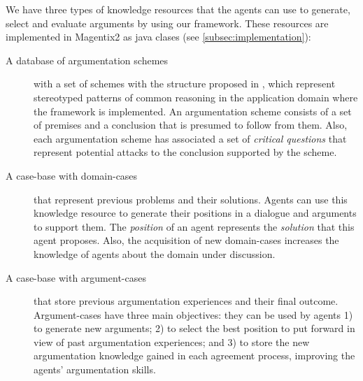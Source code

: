 %


We have three types of knowledge resources that the agents can use to generate, select and evaluate arguments by using our framework. These resources are implemented in Magentix2 as java clases (see \ref{subsec:implementation}):

\begin{description}
 \item[A database of argumentation schemes] with a set of schemes with the structure proposed in \cite{Walton08}, which represent stereotyped patterns of common reasoning in the application domain where the framework is implemented. An argumentation scheme consists of a set of premises and a conclusion that is presumed to follow from them. Also, each argumentation scheme has associated a set of \emph{critical questions} that represent potential attacks to the conclusion supported by the scheme.
 \item[A case-base with domain-cases] that represent previous problems and their solutions. Agents can use this knowledge resource to generate their positions in a dialogue and arguments to support them. The \emph{position} of an agent represents the \emph{solution} that this agent proposes. Also, the acquisition of new domain-cases increases the knowledge of agents about the domain under discussion.
 \item[A case-base with argument-cases] that store previous argumentation experiences and their final outcome. Argument-cases have three main objectives: they can be used by agents 1) to generate new arguments; 2) to select the best position to put forward in view of past argumentation experiences; and 3) to store the new argumentation knowledge gained in each agreement process, improving the agents' argumentation skills.
\end{description}

